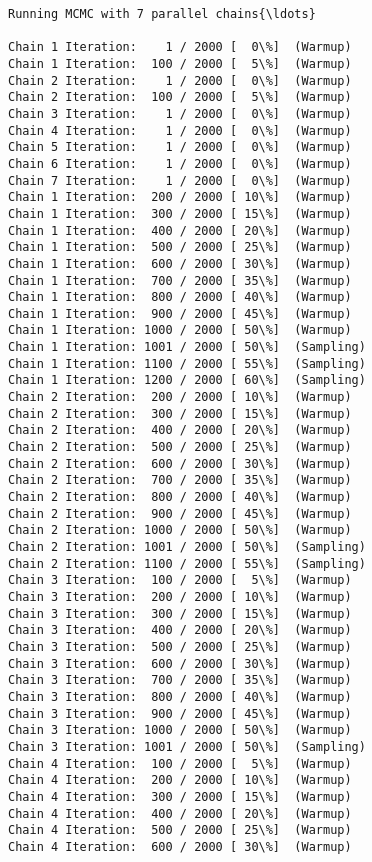 \documentclass[11pt]{article}
\begin{document}
    \begin{Verbatim}[commandchars=\\\{\}]
Running MCMC with 7 parallel chains{\ldots}

Chain 1 Iteration:    1 / 2000 [  0\%]  (Warmup)
Chain 1 Iteration:  100 / 2000 [  5\%]  (Warmup)
Chain 2 Iteration:    1 / 2000 [  0\%]  (Warmup)
Chain 2 Iteration:  100 / 2000 [  5\%]  (Warmup)
Chain 3 Iteration:    1 / 2000 [  0\%]  (Warmup)
Chain 4 Iteration:    1 / 2000 [  0\%]  (Warmup)
Chain 5 Iteration:    1 / 2000 [  0\%]  (Warmup)
Chain 6 Iteration:    1 / 2000 [  0\%]  (Warmup)
Chain 7 Iteration:    1 / 2000 [  0\%]  (Warmup)
Chain 1 Iteration:  200 / 2000 [ 10\%]  (Warmup)
Chain 1 Iteration:  300 / 2000 [ 15\%]  (Warmup)
Chain 1 Iteration:  400 / 2000 [ 20\%]  (Warmup)
Chain 1 Iteration:  500 / 2000 [ 25\%]  (Warmup)
Chain 1 Iteration:  600 / 2000 [ 30\%]  (Warmup)
Chain 1 Iteration:  700 / 2000 [ 35\%]  (Warmup)
Chain 1 Iteration:  800 / 2000 [ 40\%]  (Warmup)
Chain 1 Iteration:  900 / 2000 [ 45\%]  (Warmup)
Chain 1 Iteration: 1000 / 2000 [ 50\%]  (Warmup)
Chain 1 Iteration: 1001 / 2000 [ 50\%]  (Sampling)
Chain 1 Iteration: 1100 / 2000 [ 55\%]  (Sampling)
Chain 1 Iteration: 1200 / 2000 [ 60\%]  (Sampling)
Chain 2 Iteration:  200 / 2000 [ 10\%]  (Warmup)
Chain 2 Iteration:  300 / 2000 [ 15\%]  (Warmup)
Chain 2 Iteration:  400 / 2000 [ 20\%]  (Warmup)
Chain 2 Iteration:  500 / 2000 [ 25\%]  (Warmup)
Chain 2 Iteration:  600 / 2000 [ 30\%]  (Warmup)
Chain 2 Iteration:  700 / 2000 [ 35\%]  (Warmup)
Chain 2 Iteration:  800 / 2000 [ 40\%]  (Warmup)
Chain 2 Iteration:  900 / 2000 [ 45\%]  (Warmup)
Chain 2 Iteration: 1000 / 2000 [ 50\%]  (Warmup)
Chain 2 Iteration: 1001 / 2000 [ 50\%]  (Sampling)
Chain 2 Iteration: 1100 / 2000 [ 55\%]  (Sampling)
Chain 3 Iteration:  100 / 2000 [  5\%]  (Warmup)
Chain 3 Iteration:  200 / 2000 [ 10\%]  (Warmup)
Chain 3 Iteration:  300 / 2000 [ 15\%]  (Warmup)
Chain 3 Iteration:  400 / 2000 [ 20\%]  (Warmup)
Chain 3 Iteration:  500 / 2000 [ 25\%]  (Warmup)
Chain 3 Iteration:  600 / 2000 [ 30\%]  (Warmup)
Chain 3 Iteration:  700 / 2000 [ 35\%]  (Warmup)
Chain 3 Iteration:  800 / 2000 [ 40\%]  (Warmup)
Chain 3 Iteration:  900 / 2000 [ 45\%]  (Warmup)
Chain 3 Iteration: 1000 / 2000 [ 50\%]  (Warmup)
Chain 3 Iteration: 1001 / 2000 [ 50\%]  (Sampling)
Chain 4 Iteration:  100 / 2000 [  5\%]  (Warmup)
Chain 4 Iteration:  200 / 2000 [ 10\%]  (Warmup)
Chain 4 Iteration:  300 / 2000 [ 15\%]  (Warmup)
Chain 4 Iteration:  400 / 2000 [ 20\%]  (Warmup)
Chain 4 Iteration:  500 / 2000 [ 25\%]  (Warmup)
Chain 4 Iteration:  600 / 2000 [ 30\%]  (Warmup)

\end{Verbatim}
\end{document}
